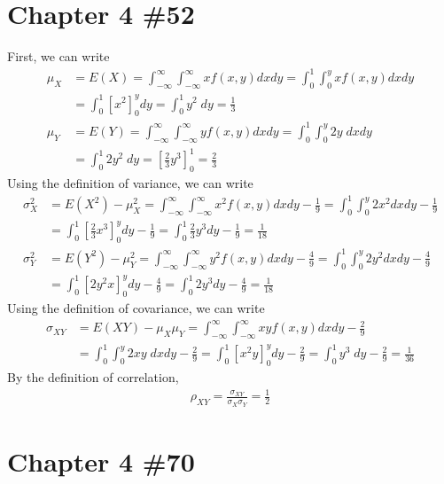 \documentclass{scrartcl}
\begin{document}
\section{Chapter 4 \#52}
First, we can write
\begin{align*}
  \mu_X
  &= E(X) = \int^\infty_{-\infty} \int^\infty_{-\infty} x f(x, y) dx dy
  = \int^1_0 \int^y_0 x f(x, y) dx dy \\
  &= \int^1_0 \left[ x^2 \right]^y_0 dy = \int^1_0 y^2\; dy = \frac{1}{3} \\
  \mu_Y
  &= E(Y) = \int^\infty_{-\infty} \int^\infty_{-\infty} y f(x, y) dx dy
  = \int^1_0 \int^y_0 2y\; dx dy \\
  &= \int^1_0 2y^2\; dy = \left[ \frac{2}{3}y^3 \right]^1_0 = \frac{2}{3}
\end{align*}
Using the definition of variance, we can write
\begin{align*}
  \sigma^2_X
  &= E(X^2) - \mu_X^2
  = \int^\infty_{-\infty} \int^\infty_{-\infty} x^2 f(x, y) dx dy - \frac{1}{9}
  = \int^1_0 \int^y_0 2x^2 dx dy - \frac{1}{9} \\
  &= \int^1_0 \left[ \frac{2}{3}x^3 \right]^y_0 dy - \frac{1}{9}
  = \int^1_0 \frac{2}{3}y^3 dy - \frac{1}{9} = \frac{1}{18} \\
  \sigma^2_Y
  &= E(Y^2) - \mu_Y^2
  = \int^\infty_{-\infty} \int^\infty_{-\infty} y^2 f(x, y) dx dy - \frac{4}{9}
  = \int^1_0 \int^y_0 2y^2 dx dy - \frac{4}{9} \\
  &= \int^1_0 \left[ 2y^2 x \right]^y_0 dy - \frac{4}{9}
  = \int^1_0 2y^3 dy - \frac{4}{9} = \frac{1}{18}
\end{align*}
Using the definition of covariance, we can write
\begin{align*}
  \sigma_{XY}
  &= E(XY) - \mu_X \mu_Y
  = \int^\infty_{-\infty} \int^\infty_{-\infty}
    xy f(x, y) dx dy - \frac{2}{9} \\
  &= \int^1_0 \int^y_0 2xy\; dx dy - \frac{2}{9}
  = \int^1_0 \left[ x^2 y \right]^y_0 dy - \frac{2}{9}
  = \int^1_0 y^3\; dy - \frac{2}{9} = \frac{1}{36}
\end{align*}
By the definition of correlation,
\begin{align*}
  \rho_{XY} = \frac{\sigma_{XY}}{\sigma_X \sigma_Y} = \frac{1}{2}
\end{align*}

\section{Chapter 4 \#70}
\end{document}
